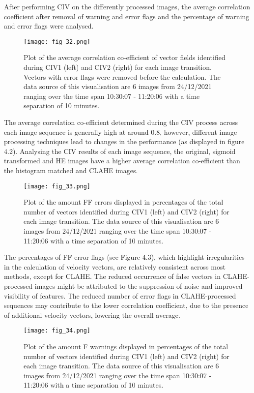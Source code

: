 After performing CIV on the differently processed images, the average correlation coefficient  after removal of warning and error flags and the percentage of warning and error flags were analysed.
\FloatBarrier
\begin{figure}[h!] 
    \centering
    \texttt{[image: fig\_32.png]}
    \caption{Plot of the average correlation co-efficient of vector fields identified during CIV1 (left) and CIV2 (right) for each image transition. Vectors with error flags were removed before the calculation. The data source of this visualisation are 6 images from 24/12/2021 ranging over the time span 10:30:07 - 11:20:06 with a time separation of 10 minutes.}
\end{figure}
\FloatBarrier
The average correlation co-efficient determined during the CIV process across each image sequence is generally high at around 0.8, however, different image processing techniques lead to changes in the performance (as displayed in figure 4.2). 
Analysing the CIV results of each image sequence, the original, sigmoid transformed and HE images have a higher average correlation co-efficient than the histogram matched and CLAHE images.
\FloatBarrier
\begin{figure}[h!] 
    \centering
    \texttt{[image: fig\_33.png]}
    \caption{Plot of the amount FF errors displayed in percentages of the total number of vectors identified during CIV1 (left) and CIV2 (right) for each image transition. The data source of this visualisation are 6 images from 24/12/2021 ranging over the time span 10:30:07 - 11:20:06 with a time separation of 10 minutes.}
\end{figure}
\FloatBarrier
The percentages of FF error flags (see Figure 4.3), which highlight irregularities in the calculation of velocity vectors\cite{TutorialUVMAT}, are relatively consistent across most methods, except for CLAHE. 
The reduced occurrence of false vectors in CLAHE-processed images might be attributed to the suppression of noise and improved visibility of features. The reduced number of error flags in CLAHE-processed sequences may contribute to the lower correlation coefficient, due to the presence of additional velocity vectors, lowering the overall average.
\FloatBarrier
\begin{figure}[h!] 
    \centering
    \texttt{[image: fig\_34.png]}
    \caption{Plot of the amount F warnings displayed in percentages of the total number of vectors identified during CIV1 (left) and CIV2 (right) for each image transition. The data source of this visualisation are 6 images from 24/12/2021 ranging over the time span 10:30:07 - 11:20:06 with a time separation of 10 minutes.}
\end{figure}
